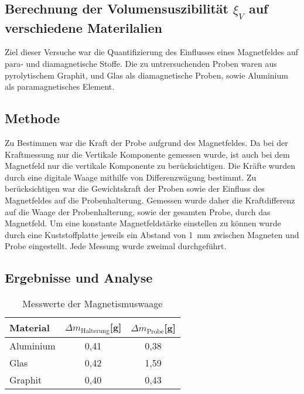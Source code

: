 \subsection{Berechnung der Volumensuszibilität $\xi_V$ auf verschiedene Materilalien}
Ziel dieser Versuche war die Quantifizierung des Einflusses eines Magnetfeldes auf para- und diamagnetische Stoffe. Die zu untrersuchenden Proben waren aus pyrolytischem Graphit, und Glas als diamagnetische Proben, sowie Aluminium als paramagnetisches Element.\\
\subsection{Methode}
Zu Bestimmen war die Kraft der Probe aufgrund des Magnetfeldes. Da bei der Kraftmessung nur die Vertikale Komponente gemessen wurde, ist auch bei dem Magnetfeld nur die vertikale Komponente zu berücksichtigen. Die Kräfte wurden durch eine digitale Waage mithilfe von Differenzwägung bestimmt.
 Zu berücksichtigen war die Gewichtskraft der Proben sowie der Einfluss des Magnetfeldes auf die Probenhalterung.
 Gemessen wurde daher die Kraftdifferenz auf die Waage der Probenhalterung, sowie der gesamten Probe, durch das Magnetfeld.
Um eine konstante Magnetfeldstärke einstellen zu können wurde durch eine Kuststoffplatte jeweils ein Abstand von \SI{1}{mm} zwischen Magneten und Probe eingestellt. Jede Messung wurde zweimal durchgeführt.

\subsection{Ergebnisse und Analyse}


\begin{table}
\caption{Messwerte der Magnetismuswaage}
\begin{center}
	

\begin{tabular}{|l|c|c|}

\hline
Material&$\Delta m_{\textrm{Halterung}}$[g]&$\Delta m_{\textrm{Probe}}$[g]\\
\hline
Aluminium &0,41&0,38\\
\hline
Glas&0,42&1,59
\\ \hline
Graphit&0,40&0,43
\\ \hline

\end{tabular}
\end{center}
\label{vsus}

\end{table}

